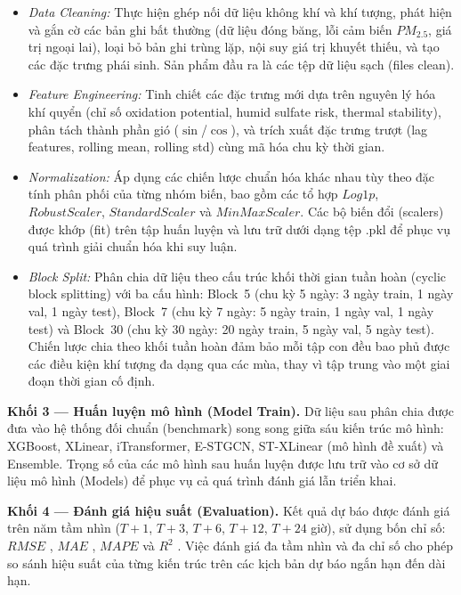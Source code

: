 \begin{itemize}
    \item \textit{Data Cleaning:} Thực hiện ghép nối dữ liệu không khí và khí tượng, phát hiện và gắn cờ các bản ghi bất thường (dữ liệu đóng băng, lỗi cảm biến $PM_{2.5}$, giá trị ngoại lai), loại bỏ bản ghi trùng lặp, nội suy giá trị khuyết thiếu, và tạo các đặc trưng phái sinh. Sản phẩm đầu ra là các tệp dữ liệu sạch (files clean).
    
    \item \textit{Feature Engineering:} Tinh chiết các đặc trưng mới dựa trên nguyên lý hóa khí quyển (chỉ số oxidation potential, humid sulfate risk, thermal stability), phân tách thành phần gió ($\sin$/$\cos$), và trích xuất đặc trưng trượt (lag features, rolling mean, rolling std) cùng mã hóa chu kỳ thời gian.
    
    \item \textit{Normalization:} Áp dụng các chiến lược chuẩn hóa khác nhau tùy theo đặc tính phân phối của từng nhóm biến, bao gồm các tổ hợp $Log1p$, $RobustScaler$, $StandardScaler$ và $MinMaxScaler$. Các bộ biến đổi (scalers) được khớp (fit) trên tập huấn luyện và lưu trữ dưới dạng tệp .pkl để phục vụ quá trình giải chuẩn hóa khi suy luận.
    
    \item \textit{Block Split:} Phân chia dữ liệu theo cấu trúc khối thời gian tuần hoàn (cyclic block splitting) với ba cấu hình: Block~5 (chu kỳ 5 ngày: 3 ngày train, 1 ngày val, 1 ngày test), Block~7 (chu kỳ 7 ngày: 5 ngày train, 1 ngày val, 1 ngày test) và Block~30 (chu kỳ 30 ngày: 20 ngày train, 5 ngày val, 5 ngày test). Chiến lược chia theo khối tuần hoàn đảm bảo mỗi tập con đều bao phủ được các điều kiện khí tượng đa dạng qua các mùa, thay vì tập trung vào một giai đoạn thời gian cố định.
\end{itemize}

\textbf{Khối 3 --- Huấn luyện mô hình (Model Train).} Dữ liệu sau phân chia được đưa vào hệ thống đối chuẩn (benchmark) song song giữa sáu kiến trúc mô hình: XGBoost, XLinear, iTransformer, E-STGCN, ST-XLinear (mô hình đề xuất) và Ensemble. Trọng số của các mô hình sau huấn luyện được lưu trữ vào cơ sở dữ liệu mô hình (Models) để phục vụ cả quá trình đánh giá lẫn triển khai.

\textbf{Khối 4 --- Đánh giá hiệu suất (Evaluation).} Kết quả dự báo được đánh giá trên năm tầm nhìn ($T+1$, $T+3$, $T+6$, $T+12$, $T+24$ giờ), sử dụng bốn chỉ số: $RMSE$ \cite{chai2014rmse}, $MAE$ \cite{willmott2005mae}, $MAPE$ \cite{armstrong1992mape} và $R^2$ \cite{nagelkerke1991r2}. Việc đánh giá đa tầm nhìn và đa chỉ số cho phép so sánh hiệu suất của từng kiến trúc trên các kịch bản dự báo ngắn hạn đến dài hạn.

